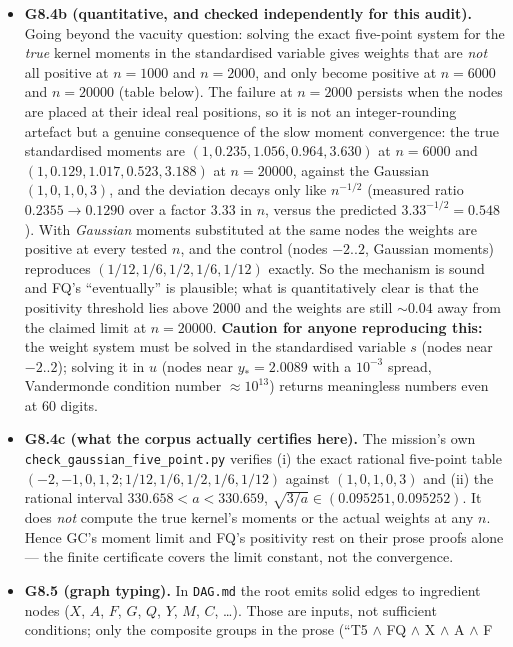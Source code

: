 \documentclass[11pt]{article}
\begin{document}
\begin{itemize}[leftmargin=1.4em]
\item \textbf{G8.4b (quantitative, and checked independently for this audit).} Going beyond the
      vacuity question: solving the exact five-point system for the \emph{true} kernel moments in the
      standardised variable gives weights that are \emph{not} all positive at $n=1000$ and $n=2000$,
      and only become positive at $n=6000$ and $n=20000$ (table below). The failure at $n=2000$
      persists when the nodes are placed at their ideal real positions, so it is not an
      integer-rounding artefact but a genuine consequence of the slow moment convergence: the true
      standardised moments are $(1,0.235,1.056,0.964,3.630)$ at $n=6000$ and
      $(1,0.129,1.017,0.523,3.188)$ at $n=20000$, against the Gaussian $(1,0,1,0,3)$, and the
      deviation decays only like $n^{-1/2}$ (measured ratio $0.2355\to0.1290$ over a factor $3.33$ in
      $n$, versus the predicted $3.33^{-1/2}=0.548$). With \emph{Gaussian} moments substituted at the
      same nodes the weights are positive at every tested $n$, and the control
      (nodes $-2..2$, Gaussian moments) reproduces $(1/12,1/6,1/2,1/6,1/12)$ exactly. So the
      mechanism is sound and FQ's ``eventually'' is plausible; what is quantitatively clear is that
      the positivity threshold lies above $2000$ and the weights are still $\sim0.04$ away from the
      claimed limit at $n=20000$. \textbf{Caution for anyone reproducing this:} the weight system
      must be solved in the standardised variable $s$ (nodes near $-2..2$); solving it in $u$ (nodes
      near $y_*=2.0089$ with a $10^{-3}$ spread, Vandermonde condition number $\approx10^{13}$) returns
      meaningless numbers even at $60$ digits.
\item \textbf{G8.4c (what the corpus actually certifies here).} The mission's own
      \texttt{check\_gaussian\_five\_point.py} verifies (i) the exact rational five-point table
      $(-2,-1,0,1,2;1/12,1/6,1/2,1/6,1/12)$ against $(1,0,1,0,3)$ and (ii) the rational interval
      $330.658<a<330.659$, $\sqrt{3/a}\in(0.095251,0.095252)$. It does \emph{not} compute the true
      kernel's moments or the actual weights at any $n$. Hence GC's moment limit and FQ's positivity
      rest on their prose proofs alone --- the finite certificate covers the limit constant, not the
      convergence.
\item \textbf{G8.5 (graph typing).} In \texttt{DAG.md} the root emits solid edges to ingredient nodes
      ($X$, $A$, $F$, $G$, $Q$, $Y$, $M$, $C$, \dots). Those are inputs, not sufficient conditions;
      only the composite groups in the prose (``T5 $\wedge$ FQ $\wedge$ X $\wedge$ A $\wedge$ F

\end{itemize}
\end{document}
